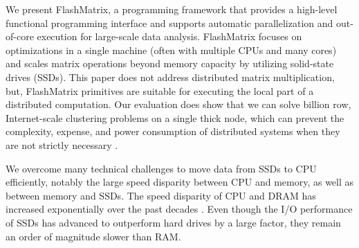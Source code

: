 

We present FlashMatrix, a programming framework that provides a high-level
functional programming interface and supports automatic
parallelization and out-of-core execution for large-scale data analysis.
FlashMatrix focuses on optimizations in a single machine (often with multiple
CPUs and many cores) and scales matrix operations beyond memory capacity by 
utilizing solid-state drives (SSDs).  
This paper does not address distributed matrix multiplication, but, 
FlashMatrix primitives are suitable for executing the local part of a distributed 
computation.   
Our evaluation does show that we can solve billion row, Internet-scale 
clustering problems on a single thick node, which can prevent the complexity,
expense, and power consumption of distributed systems when they are not strictly necessary
\cite{hotos}.








We overcome many technical challenges to move data from SSDs to CPU efficiently,
notably the large speed disparity between CPU and memory, as well as between
memory and SSDs. The speed disparity of CPU and DRAM has increased exponentially
over the past decades \cite{Wilkes01}. Even though the I/O performance of SSDs
has advanced to outperform hard drives by a large factor, they remain an order
of magnitude slower than RAM.  

